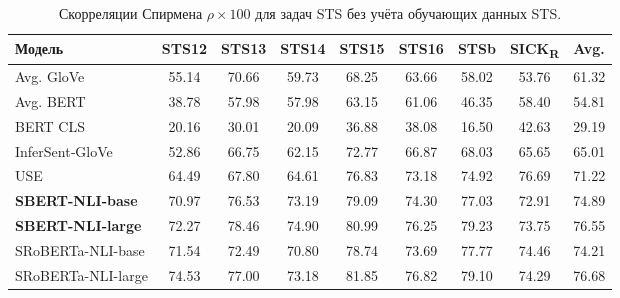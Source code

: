 \begin{table}[H]
\centering
\small
\caption{Скорреляции Спирмена $\rho \times 100$ для задач STS без учёта обучающих данных STS.}
\begin{tabular}{lccccccc}
\toprule
\textbf{Модель} & STS12 & STS13 & STS14 & STS15 & STS16 & STSb & SICK\textsubscript{R} & Avg.\\
\midrule
Avg. GloVe              & 55.14 & 70.66 & 59.73 & 68.25 & 63.66 & 58.02 & 53.76 & 61.32\\
Avg. BERT               & 38.78 & 57.98 & 57.98 & 63.15 & 61.06 & 46.35 & 58.40 & 54.81\\
BERT CLS                & 20.16 & 30.01 & 20.09 & 36.88 & 38.08 & 16.50 & 42.63 & 29.19\\
InferSent‐GloVe         & 52.86 & 66.75 & 62.15 & 72.77 & 66.87 & 68.03 & 65.65 & 65.01\\
USE                     & 64.49 & 67.80 & 64.61 & 76.83 & 73.18 & 74.92 & 76.69 & 71.22\\
\midrule
\textbf{SBERT-NLI-base} & 70.97 & 76.53 & 73.19 & 79.09 & 74.30 & 77.03 & 72.91 & 74.89\\
\textbf{SBERT-NLI-large}& 72.27 & 78.46 & 74.90 & 80.99 & 76.25 & 79.23 & 73.75 & 76.55\\
SRoBERTa-NLI-base       & 71.54 & 72.49 & 70.80 & 78.74 & 73.69 & 77.77 & 74.46 & 74.21\\
SRoBERTa-NLI-large      & 74.53 & 77.00 & 73.18 & 81.85 & 76.82 & 79.10 & 74.29 & 76.68\\
\bottomrule
\end{tabular}
\end{table}

